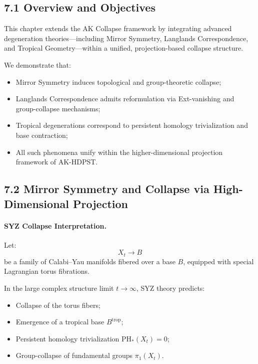 \documentclass[11pt]{article}
\begin{document}
\subsection*{7.1 Overview and Objectives}

This chapter extends the AK Collapse framework by integrating advanced degeneration theories—including Mirror Symmetry, Langlands Correspondence, and Tropical Geometry—within a unified, projection-based collapse structure.

We demonstrate that:

\begin{itemize}
    \item Mirror Symmetry induces topological and group-theoretic collapse;
    \item Langlands Correspondence admits reformulation via Ext-vanishing and group-collapse mechanisms;
    \item Tropical degenerations correspond to persistent homology trivialization and base contraction;
    \item All such phenomena unify within the higher-dimensional projection framework of AK-HDPST.
\end{itemize}

\subsection*{7.2 Mirror Symmetry and Collapse via High-Dimensional Projection}

\paragraph{SYZ Collapse Interpretation.}
Let:
\[
X_t \longrightarrow B
\]
be a family of Calabi–Yau manifolds fibered over a base \( B \), equipped with special Lagrangian torus fibrations.

In the large complex structure limit \( t \to \infty \), SYZ theory predicts:

\begin{itemize}
    \item Collapse of the torus fibers;
    \item Emergence of a tropical base \( B^{\mathrm{trop}} \);
    \item Persistent homology trivialization \( \mathrm{PH}_*(X_t) = 0 \);
    \item Group-collapse of fundamental groups \( \pi_1(X_t) \).
\end{itemize}
\end{document}
